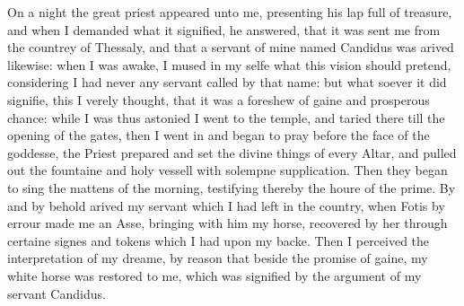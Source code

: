 On a night the great priest appeared unto me, presenting his lap full of
treasure, and when I demanded what it signified, he answered, that it was sent
me from the countrey of Thessaly, and that a servant of mine named Candidus was
arived likewise: when I was awake, I mused in my selfe what this vision should
pretend, considering I had never any servant called by that name: but what
soever it did signifie, this I verely thought, that it was a foreshew of gaine
and prosperous chance: while I was thus astonied I went to the temple, and
taried there till the opening of the gates, then I went in and began to pray
before the face of the goddesse, the Priest prepared and set the divine things
of every Altar, and pulled out the fountaine and holy vessell with solempne
supplication. Then they began to sing the mattens of the morning, testifying
thereby the houre of the prime. By and by behold arived my servant which I had
left in the country, when Fotis by errour made me an Asse, bringing with him my
horse, recovered by her through certaine signes and tokens which I had upon my
backe. Then I perceived the interpretation of my dreame, by reason that beside
the promise of gaine, my white horse was restored to me, which was signified by
the argument of my servant Candidus.

